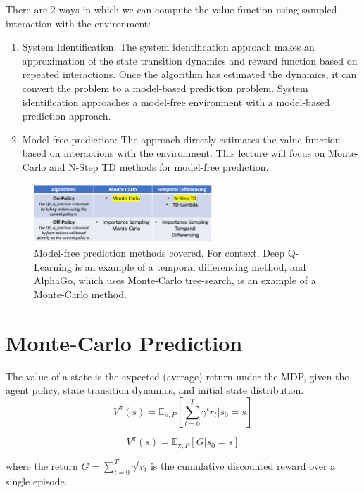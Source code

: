 \documentclass[11pt]{article}
\def\EE{\mathbb{E}}
\begin{document}
There are 2 ways in which we can compute the value function using sampled interaction with the environment:
\begin{enumerate}
    \item System Identification: The system identification approach makes an approximation of the state transition dynamics and reward function based on repeated interactions. Once the algorithm has estimated the dynamics, it can convert the problem to a model-based prediction problem. System identification approaches a model-free environment with a model-based prediction approach.
    \item Model-free prediction: The approach directly estimates the value function based on interactions with the environment. This lecture will focus on Monte-Carlo and N-Step TD methods for model-free prediction.
\end{enumerate}


\begin{figure}[H]
    \centering
    \includegraphics[width=0.6\textwidth]{images/algo_table.png}
    \caption{Model-free prediction methods covered. For context, Deep Q-Learning is an example of a temporal differencing method, and AlphaGo, which uses Monte-Carlo tree-search, is an example of a Monte-Carlo method.}
    \label{fig:methods}
\end{figure}


\section{Monte-Carlo Prediction}
The value of a state is the expected (average) return under the MDP, given the agent policy, state transition dynamics, and initial state distribution. 
\begin{equation}
    V^{\pi}(s) = \EE_{\pi, P}[\sum_{t=0}^T \gamma^t r_t|s_0=s]
\end{equation}

\begin{equation}
    V^{\pi}(s) = \EE_{\pi, P}[G|s_0=s]
\end{equation}

where the return $G = \sum_{t=0}^T \gamma^t r_t$ is the cumulative discounted reward over a single episode.
\end{document}
